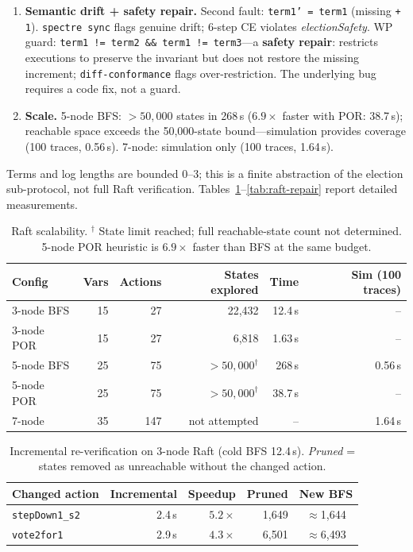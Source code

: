 \documentclass[runningheads]{../paper-vmcai-2027/llncs}
\begin{document}
\begin{enumerate}[leftmargin=1.4em,itemsep=0pt,parsep=0pt]
  \texttt{spectre verify --incremental} confirms invariant holds.
  Total end-to-end time (detect $\to$ re-verify): 1.6\,s.
\item[\textbf{(12)}] \textbf{Semantic drift + safety repair.}
  Second fault: \texttt{term1' = term1} (missing \texttt{+\,1}).
  \texttt{spectre sync} flags genuine drift; 6-step CE violates
  \emph{electionSafety}.
  WP guard: \texttt{term1 != term2 \&\& term1 != term3}---a
  \textbf{safety repair}: restricts executions to preserve the invariant
  but does not restore the missing increment; \texttt{diff-conformance} flags
  over-restriction. The underlying bug requires a code fix, not a guard.
\item[\textbf{(13)}] \textbf{Scale.}
  5-node BFS: ${>}50{,}000$ states in 268\,s ($6.9\times$ faster with POR: 38.7\,s);
  reachable space exceeds the 50{,}000-state bound---simulation provides coverage
  (100 traces, 0.56\,s).
  7-node: simulation only (100 traces, 1.64\,s).
\end{enumerate}
Terms and log lengths are bounded 0--3; this is a finite abstraction of the
election sub-protocol, not full Raft verification.
Tables~\ref{tab:raft-scale}--\ref{tab:raft-repair} report detailed measurements.

\begin{table}[t]
\caption{Raft scalability. $^\dagger$ State limit reached; full reachable-state count not determined.
  5-node POR heuristic is $6.9\times$ faster than BFS at the same budget.}\label{tab:raft-scale}
\centering\small
\begin{tabular}{lrrrrr}
\toprule
Config & Vars & Actions & States explored & Time & Sim (100 traces) \\
\midrule
3-node BFS  & 15 & 27 & 22{,}432             & 12.4\,s & -- \\
3-node POR  & 15 & 27 & 6{,}818             & 1.63\,s & -- \\
5-node BFS  & 25 & 75 & ${>}50{,}000^\dagger$ & 268\,s  & 0.56\,s \\
5-node POR  & 25 & 75 & ${>}50{,}000^\dagger$ & 38.7\,s & -- \\
7-node      & 35 & 147& not attempted        & --      & 1.64\,s \\
\bottomrule
\end{tabular}
\end{table}

\smallskip

\begin{table}[t]
\caption{Incremental re-verification on 3-node Raft (cold BFS 12.4\,s).
  \emph{Pruned} = states removed as unreachable without the changed action.}\label{tab:raft-incr}
\centering\small
\begin{tabular}{lrrrc}
\toprule
Changed action & Incremental & Speedup & Pruned & New BFS \\
\midrule
\texttt{stepDown1\_s2} & 2.4\,s & $5.2\times$ & 1{,}649 & ${\approx}$1{,}644 \\
\texttt{vote2for1}     & 2.9\,s & $4.3\times$ & 6{,}501 & ${\approx}$6{,}493 \\
\bottomrule
\end{tabular}
\end{table}
\end{document}
